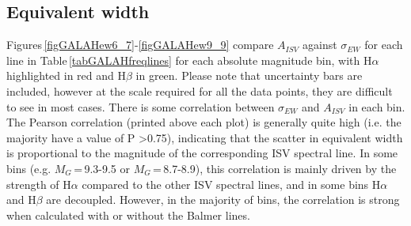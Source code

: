 \subsection{Equivalent width}
Figures\,\ref{figGALAHew6_7}-\ref{figGALAHew9_9} compare $A_{ISV}$ against $\sigma_{EW}$ for each line in Table\,\ref{tabGALAHfreqlines} for each absolute magnitude bin, with H$\alpha$ highlighted in red and H$\beta$ in green. Please note that uncertainty bars are included, however at the scale required for all the data points, they are difficult to see in most cases. There is some correlation between $\sigma_{EW}$ and $A_{ISV}$ in each bin. The Pearson correlation (printed above each plot) is generally quite high (i.e. the majority have a value of P \textgreater 0.75), indicating that the scatter in equivalent width is proportional to the magnitude of the corresponding ISV spectral line. In some bins (e.g. $M_G$\,=\,9.3-9.5 or $M_G$\,=\,8.7-8.9), this correlation is mainly driven by the strength of H$\alpha$ compared to the other ISV spectral lines, and in some bins H$\alpha$ and H$\beta$ are decoupled. However, in the majority of bins, the correlation is strong when calculated with or without the Balmer lines.\\

